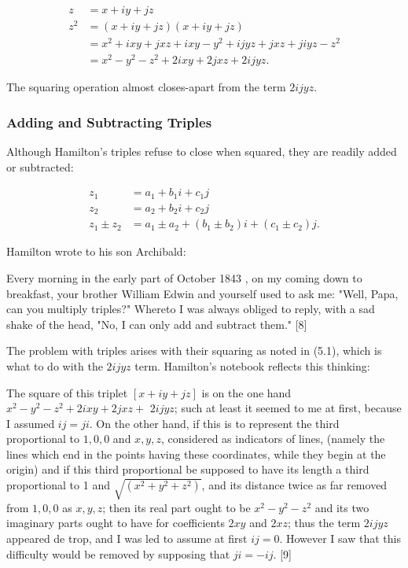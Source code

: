 \documentclass[10pt]{article}
\begin{document}
$$
\begin{aligned}
z & =x+i y+j z \\
z^{2} & =(x+i y+j z)(x+i y+j z) \\
& =x^{2}+i x y+j x z+i x y-y^{2}+i j y z+j x z+j i y z-z^{2} \\
& =x^{2}-y^{2}-z^{2}+2 i x y+2 j x z+2 i j y z .
\end{aligned}
$$

The squaring operation almost closes-apart from the term $2 i j y z$.

\subsubsection{Adding and Subtracting Triples}
Although Hamilton's triples refuse to close when squared, they are readily added or subtracted:

$$
\begin{aligned}
z_{1} & =a_{1}+b_{1} i+c_{1} j \\
z_{2} & =a_{2}+b_{2} i+c_{2} j \\
z_{1} \pm z_{2} & =a_{1} \pm a_{2}+\left(b_{1} \pm b_{2}\right) i+\left(c_{1} \pm c_{2}\right) j .
\end{aligned}
$$

Hamilton wrote to his son Archibald:

Every morning in the early part of October 1843 , on my coming down to breakfast, your brother William Edwin and yourself used to ask me: "Well, Papa, can you multiply triples?" Whereto I was always obliged to reply, with a sad shake of the head, "No, I can only add and subtract them." [8]

The problem with triples arises with their squaring as noted in (5.1), which is what to do with the $2 i j y z$ term. Hamilton's notebook reflects this thinking:

The square of this triplet $[x+i y+j z]$ is on the one hand $x^{2}-y^{2}-z^{2}+2 i x y+2 j x z+$ $2 i j y z$; such at least it seemed to me at first, because I assumed $i j=j i$. On the other hand, if this is to represent the third proportional to $1,0,0$ and $x, y, z$, considered as indicators of lines, (namely the lines which end in the points having these coordinates, while they begin at the origin) and if this third proportional be supposed to have its length a third proportional to 1 and $\sqrt{\left(x^{2}+y^{2}+z^{2}\right)}$, and its distance twice as far removed from $1,0,0$ as $x, y, z$; then its real part ought to be $x^{2}-y^{2}-z^{2}$ and its two imaginary parts ought to have for coefficients $2 x y$ and $2 x z$; thus the term $2 i j y z$ appeared de trop, and I was led to assume at first $i j=0$. However I saw that this difficulty would be removed by supposing that $j i=-i j$. [9]
\end{document}
